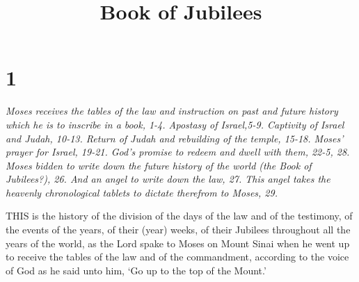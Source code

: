 

\title{Book of Jubilees}

\chapter{1}

\par \textit{Moses receives the tables of the law and instruction on past and future history which he is to inscribe in a book, 1-4. Apostasy of Israel,5-9. Captivity of Israel and Judah, 10-13. Return of Judah and rebuilding of the temple, 15-18. Moses' prayer for Israel, 19-21. God's promise to redeem and dwell with them, 22-5, 28. Moses bidden to write down the future history of the world (the Book of Jubilees?), 26. And an angel to write down the law, 27. This angel takes the heavenly chronological tablets to dictate therefrom to Moses, 29.}

\par THIS is the history of the division of the days of the law and of the testimony, of the events of the years, of their (year) weeks, of their Jubilees throughout all the years of the world, as the Lord spake to Moses on Mount Sinai when he went up to receive the tables of the law and of the commandment, according to the voice of God as he said unto him, ‘Go up to the top of the Mount.’

